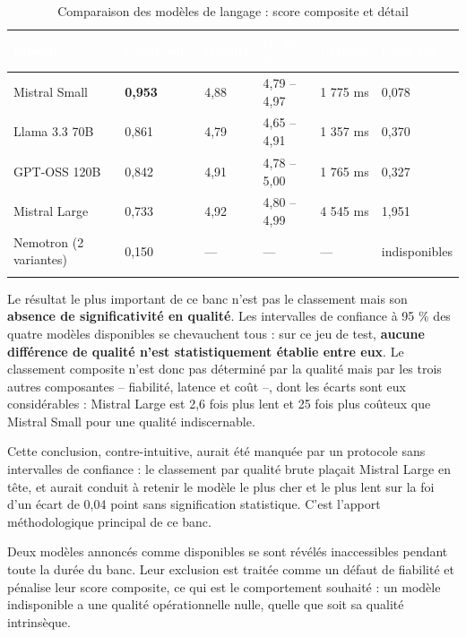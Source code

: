 \begin{longtable}{|P{3.9cm}|P{1.6cm}|P{1.5cm}|P{2.2cm}|P{1.6cm}|P{1.9cm}|}
\hline
{}
\textcolor{white}{\textbf{Modèle}} &
\textcolor{white}{\textbf{Composite}} &
\textcolor{white}{\textbf{Qualité}} &
\textcolor{white}{\textbf{IC 95 \%}} &
\textcolor{white}{\textbf{Latence}} &
\textcolor{white}{\textbf{Coût rel.}} \\
\hline
\endhead
\hline
\endfoot
\hline
\endlastfoot
Mistral Small & \textbf{0{,}953} & 4{,}88 & 4{,}79 -- 4{,}97 & 1 775 ms & 0{,}078 \\
\hline
Llama 3.3 70B & 0{,}861 & 4{,}79 & 4{,}65 -- 4{,}91 & 1 357 ms & 0{,}370 \\
\hline
GPT-OSS 120B & 0{,}842 & 4{,}91 & 4{,}78 -- 5{,}00 & 1 765 ms & 0{,}327 \\
\hline
Mistral Large & 0{,}733 & 4{,}92 & 4{,}80 -- 4{,}99 & 4 545 ms & 1{,}951 \\
\hline
Nemotron (2 variantes) & 0{,}150 & --- & --- & --- & indisponibles \\
\hline
\caption{Comparaison des modèles de langage : score composite et détail}
\label{tab:modeles-chap5}
\end{longtable}
\endgroup

Le résultat le plus important de ce banc n'est pas le classement mais son \textbf{absence de significativité en qualité}. Les intervalles de confiance à 95 \% des quatre modèles disponibles se chevauchent tous : sur ce jeu de test, \textbf{aucune différence de qualité n'est statistiquement établie entre eux}. Le classement composite n'est donc pas déterminé par la qualité mais par les trois autres composantes -- fiabilité, latence et coût --, dont les écarts sont eux considérables : Mistral Large est 2,6 fois plus lent et 25 fois plus coûteux que Mistral Small pour une qualité indiscernable.

Cette conclusion, contre-intuitive, aurait été manquée par un protocole sans intervalles de confiance : le classement par qualité brute plaçait Mistral Large en tête, et aurait conduit à retenir le modèle le plus cher et le plus lent sur la foi d'un écart de 0,04 point sans signification statistique. C'est l'apport méthodologique principal de ce banc.

Deux modèles annoncés comme disponibles se sont révélés inaccessibles pendant toute la durée du banc. Leur exclusion est traitée comme un défaut de fiabilité et pénalise leur score composite, ce qui est le comportement souhaité : un modèle indisponible a une qualité opérationnelle nulle, quelle que soit sa qualité intrinsèque.

